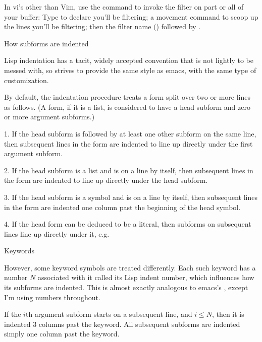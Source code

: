 In vi's other than Vim, use the \p{!} command to invoke the filter on part or all of
your buffer: Type \p{!} to declare you'll be filtering; a movement command
to scoop up the lines you'll be filtering; then the filter name
() followed by .

\beginsection How subforms are indented

Lisp indentation has a tacit, widely accepted convention that is not
lightly to be messed with, so  strives to provide the same
style as emacs, with the same type of customization.

By default, the indentation procedure treats
a form split over two or more lines as
follows.  (A form, if it is a list, is considered to have a head subform and zero or
more argument subforms.)

1.  If the head subform is followed by at
least one other subform on the same line, then subsequent lines in the
form are indented to line up directly under the first argument subform.


2. If the head subform is a list and is on a line by itself, then
subsequent lines in the form are indented to
line up directly under the head subform.


3. If the head subform is a symbol and is on a line by itself, then
subsequent lines in the form are indented one column past the beginning
of the head symbol.


4. If the head form can be deduced to be a literal, then subforms on
subsequent lines line up directly under it, e.g.


\beginsection Keywords

However, some keyword symbols are treated differently.  Each such
keyword has a number $N$ associated with it called its Lisp indent number,
which influences how its subforms are indented.  This is almost exactly
analogous to emacs's , except I'm using numbers
throughout.

If 
the $i$th argument subform starts
on a subsequent line, and $i \le N$, then it is indented 3 columns past the
keyword.  All subsequent
subforms are indented simply one column past the keyword.

